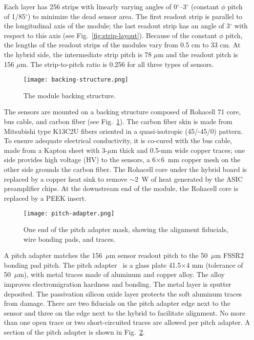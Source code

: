 Each layer has 256 strips with linearly varying angles of 0$^\circ$--3$^\circ$ (constant $\phi$ pitch of 1/85$^\circ$) to minimize the dead sensor area. The first readout strip is parallel to the longitudinal axis of the module; the last readout strip has an angle of 3$^\circ$ with respect to this axis (see Fig.~\ref{fig:strip-layout}). Because of the constant $\phi$ pitch, the lengths of the readout strips of the modules vary from 0.5 cm to 33 cm. At the hybrid side, the intermediate strip pitch is 78 $\mu$m and the readout pitch is 156 $\mu$m. The strip-to-pitch ratio is 0.256 for all three types of sensors.

\begin{figure}[hbt] 
\centering 
\texttt{[image: backing-structure.png]}
\caption{The module backing structure.}
\label{fig:backing-structure}
\end{figure}

The sensors are mounted on a backing structure composed of Rohacell 71 core, bus cable, and carbon fiber (see Fig.~\ref{fig:backing-structure}). The carbon fiber skin is made from Mitsubishi type K13C2U fibers oriented in a quasi-isotropic (45/-45/0) pattern. To ensure adequate electrical conductivity, it is co-cured with the bus cable, made from a Kapton sheet with 3-$\mu$m thick and 0.5-mm wide copper traces; one side provides high voltage (HV) to the sensors, a 6$\times$6~mm copper mesh on the other side grounds the carbon fiber.  The Rohacell core under the hybrid board is replaced by a copper heat sink to remove $\sim$2~W of heat generated by the ASIC preamplifier chips. At the downstream end of the module, the Rohacell core is replaced by a PEEK insert.  

\begin{figure}[hbt] 
\centering 
\texttt{[image: pitch-adapter.png]}
\caption{One end of the pitch adapter mask, showing the alignment fiducials, wire bonding pads, and traces.}
\label{fig:pitch-adapter}
\end{figure}

A pitch adapter matches the 156~$\mu$m sensor readout pitch to the 50~$\mu$m FSSR2 bonding pad pitch. The pitch adapter~\cite{PA} is a glass plate 41.5$\times$4 mm (tolerance of 50~$\mu$m), with metal traces made of aluminum and copper alloy. The alloy improves electromigration hardness and bonding. The metal layer is sputter deposited. The passivation silicon oxide layer protects the soft aluminum traces from damage. There are two fiducials on the pitch adapter edge next to the sensor and three on the edge next to the hybrid to facilitate alignment. No more than one open trace or two short-circuited traces are allowed per pitch adapter. A section of the pitch adapter is shown in Fig.~\ref{fig:pitch-adapter}. 

